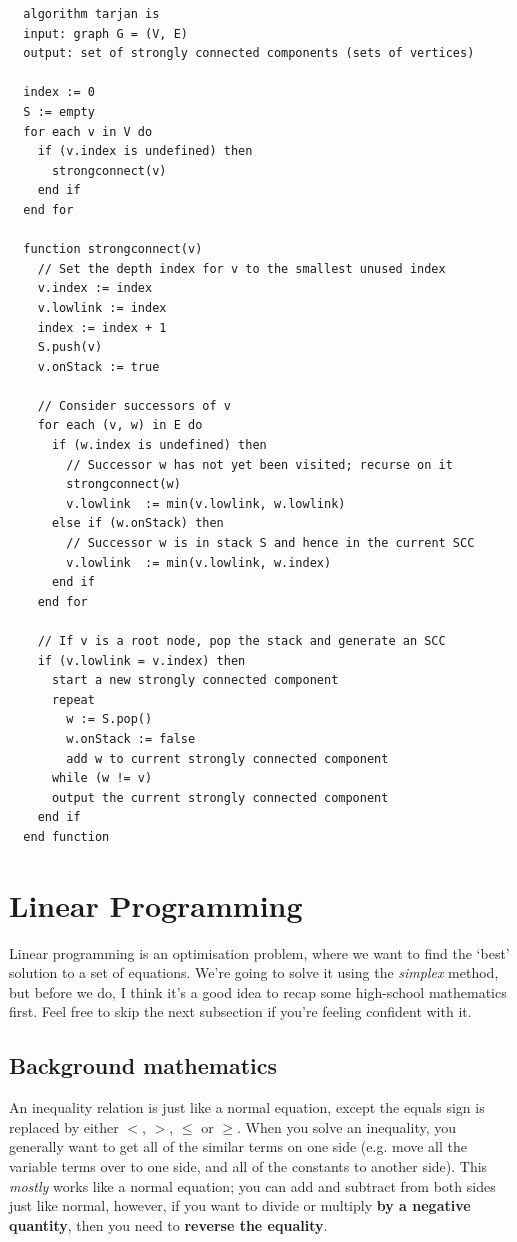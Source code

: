\begin{lstlisting}
  algorithm tarjan is
  input: graph G = (V, E)
  output: set of strongly connected components (sets of vertices)

  index := 0
  S := empty
  for each v in V do
    if (v.index is undefined) then
      strongconnect(v)
    end if
  end for

  function strongconnect(v)
    // Set the depth index for v to the smallest unused index
    v.index := index
    v.lowlink := index
    index := index + 1
    S.push(v)
    v.onStack := true

    // Consider successors of v
    for each (v, w) in E do
      if (w.index is undefined) then
        // Successor w has not yet been visited; recurse on it
        strongconnect(w)
        v.lowlink  := min(v.lowlink, w.lowlink)
      else if (w.onStack) then
        // Successor w is in stack S and hence in the current SCC
        v.lowlink  := min(v.lowlink, w.index)
      end if
    end for

    // If v is a root node, pop the stack and generate an SCC
    if (v.lowlink = v.index) then
      start a new strongly connected component
      repeat
        w := S.pop()
        w.onStack := false
        add w to current strongly connected component
      while (w != v)
      output the current strongly connected component
    end if
  end function
\end{lstlisting}


\section{Linear Programming}

Linear programming is an optimisation problem, where we want to find the `best'
solution to a set of equations. We're going to solve it using the
\textit{simplex} method, but before we do, I think it's a good idea to recap
some high-school mathematics first. Feel free to skip the next subsection if
you're feeling confident with it.

\subsection{Background mathematics}

An inequality relation is just like a normal equation, except the equals sign is
replaced by either $<$, $>$, $\leq$ or $\geq$. When you solve an inequality, you
generally want to get all of the similar terms on one side (e.g. move all the
variable terms over to one side, and all of the constants to another side). This
\textit{mostly} works like a normal equation; you can add and subtract from both
sides just like normal, however, if you want to divide or multiply \textbf{by a
negative quantity}, then you need to \textbf{reverse the equality}.

